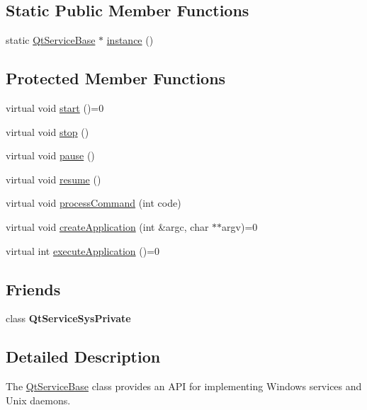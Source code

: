 \subsection*{Static Public Member Functions}
\begin{DoxyCompactItemize}
\item 
static \mbox{\hyperlink{class_qt_service_base}{Qt\+Service\+Base}} $\ast$ \mbox{\hyperlink{class_qt_service_base_a8f030376e32cc47736bfc1a1e1ecf855}{instance}} ()
\end{DoxyCompactItemize}
\subsection*{Protected Member Functions}
\begin{DoxyCompactItemize}
\item 
virtual void \mbox{\hyperlink{class_qt_service_base_adbc0cd621b41bd3a6a1f62fda432e9e4}{start}} ()=0
\item 
virtual void \mbox{\hyperlink{class_qt_service_base_a8d52c1b8fd06b50bdc0a0c6f9936a68e}{stop}} ()
\item 
virtual void \mbox{\hyperlink{class_qt_service_base_a43215a7c5c047d30bcf4f697e6691f89}{pause}} ()
\item 
virtual void \mbox{\hyperlink{class_qt_service_base_aaa2e05ef1c36283b6b35348c3972b489}{resume}} ()
\item 
virtual void \mbox{\hyperlink{class_qt_service_base_a47485f00f6eba0758d2ffc75092295cf}{process\+Command}} (int code)
\item 
virtual void \mbox{\hyperlink{class_qt_service_base_ac5ae73935f489282b35c70b27b341390}{create\+Application}} (int \&argc, char $\ast$$\ast$argv)=0
\item 
virtual int \mbox{\hyperlink{class_qt_service_base_ab70633cd29a22758dfa0502b77e564f6}{execute\+Application}} ()=0
\end{DoxyCompactItemize}
\subsection*{Friends}
\begin{DoxyCompactItemize}
\item 
\mbox{\label{class_qt_service_base_a3101d1ae35029ba305c82b8f49512d6f}} 
class {\bfseries Qt\+Service\+Sys\+Private}
\end{DoxyCompactItemize}


\subsection{Detailed Description}
The \mbox{\hyperlink{class_qt_service_base}{Qt\+Service\+Base}} class provides an A\+PI for implementing Windows services and Unix daemons. 

